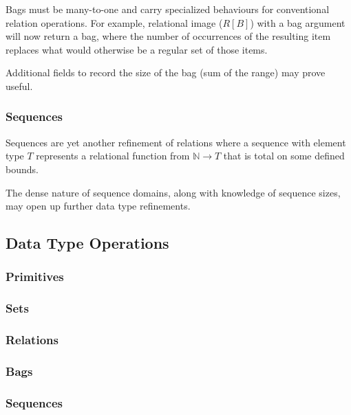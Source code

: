 Bags must be many-to-one and carry specialized behaviours for conventional relation operations. For example, relational image ($R[B]$) with a bag argument will now return a bag, where the number of occurrences of the resulting item replaces what would otherwise be a regular set of those items.

Additional fields to record the size of the bag (sum of the range) may prove useful.

\subsubsection{Sequences}
Sequences are yet another refinement of relations where a sequence with element type $T$ represents a relational function from $\mathbb{N} \rightarrow T$ that is total on some defined bounds.

The dense nature of sequence domains, along with knowledge of sequence sizes, may open up further data type refinements.

\subsection{Data Type Operations}
\subsubsection{Primitives}
\subsubsection{Sets}
\subsubsection{Relations}
\subsubsection{Bags}
\subsubsection{Sequences}

